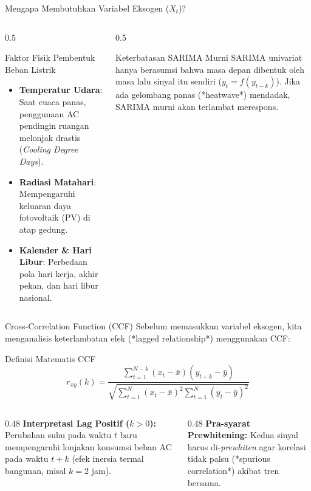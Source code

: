 \documentclass[aspectratio=169, 10pt]{beamer}
\begin{document}
\begin{frame}{Mengapa Membutuhkan Variabel Eksogen ($X_t$)?}
    \begin{columns}[T]
        \begin{column}{0.5\textwidth}
            \begin{block}{Faktor Fisik Pembentuk Beban Listrik}
                \begin{itemize}
                    \item \textbf{Temperatur Udara}: Saat cuaca panas, penggunaan AC pendingin ruangan melonjak drastis (\textit{Cooling Degree Days}).
                    \item \textbf{Radiasi Matahari}: Mempengaruhi keluaran daya fotovoltaik (PV) di atap gedung.
                    \item \textbf{Kalender \& Hari Libur}: Perbedaan pola hari kerja, akhir pekan, dan hari libur nasional.
                \end{itemize}
            \end{block}
        \end{column}
        \begin{column}{0.5\textwidth}
            \begin{alertblock}{Keterbatasan SARIMA Murni}
                SARIMA univariat hanya berasumsi bahwa masa depan dibentuk oleh masa lalu sinyal itu sendiri ($y_t = f(y_{t-k})$). Jika ada gelombang panas (*heatwave*) mendadak, SARIMA murni akan terlambat merespons.
            \end{alertblock}
        \end{column}
    \end{columns}
\end{frame}

\begin{frame}{Cross-Correlation Function (CCF)}
    Sebelum memasukkan variabel eksogen, kita menganalisis keterlambatan efek (*lagged relationship*) menggunakan CCF:
    \begin{block}{Definisi Matematis CCF}
        \begin{equation}
            r_{xy}(k) = \frac{\sum_{t=1}^{N-k} (x_t - \bar{x})(y_{t+k} - \bar{y})}{\sqrt{\sum_{t=1}^N (x_t - \bar{x})^2 \sum_{t=1}^N (y_t - \bar{y})^2}}
        \end{equation}
    \end{block}
    \begin{columns}[T]
        \begin{column}{0.48\textwidth}
            \textbf{Interpretasi Lag Positif ($k > 0$):}
            Perubahan suhu pada waktu $t$ baru mempengaruhi lonjakan konsumsi beban AC pada waktu $t+k$ (efek inersia termal bangunan, misal $k=2$ jam).
        \end{column}
        \begin{column}{0.48\textwidth}
            \textbf{Pra-syarat Prewhitening:}
            Kedua sinyal harus di-\textit{prewhiten} agar korelasi tidak palsu (*spurious correlation*) akibat tren bersama.
        \end{column}
    \end{columns}
\end{frame}
\end{document}
